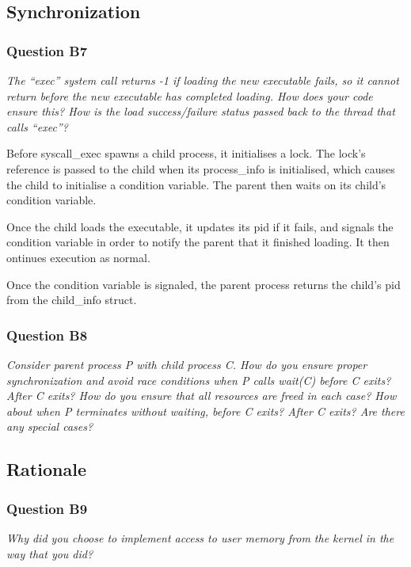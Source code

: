 \subsection{Synchronization}

\subsubsection*{Question B7} %
\textit{The ``exec'' system call returns -1 if loading the new executable fails, so it cannot return before the new executable has completed loading.  How does your code ensure this?  How is the load success/failure status passed back to the thread that calls ``exec''?}

Before syscall\_exec spawns a child process, it initialises a lock. The lock's reference is passed to the child when its process\_info is initialised, which causes the child to initialise a condition variable. The parent then waits on its child's condition variable.

Once the child loads the executable, it updates its pid if it fails, and signals the condition variable in order to notify the parent that it finished loading. It then ontinues execution as normal.

Once the condition variable is signaled, the parent process returns the child's pid from the child\_info struct.

\subsubsection*{Question B8} %
\textit{Consider parent process P with child process C.  How do you ensure proper synchronization and avoid race conditions when P calls wait(C) before C exits?  After C exits?  How do you ensure that all resources are freed in each case?  How about when P terminates without waiting, before C exits?  After C exits?  Are there any special cases?}



\subsection{Rationale}

\subsubsection*{Question B9} %
\textit{Why did you choose to implement access to user memory from the kernel in the way that you did?}

